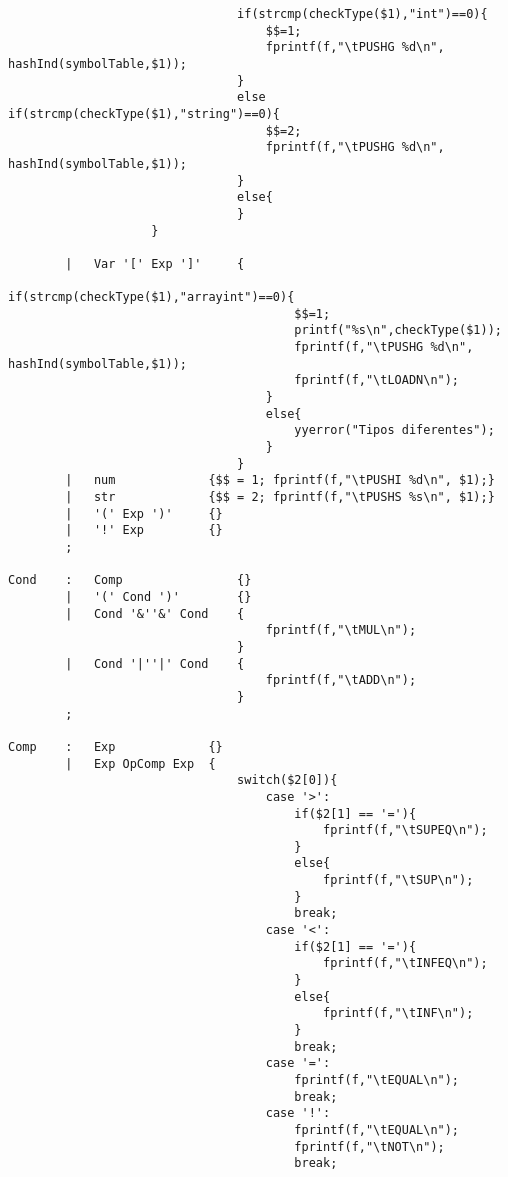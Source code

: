 \documentclass{report}
\begin{document}
\begin{verbatim}
                                if(strcmp(checkType($1),"int")==0){
                                    $$=1;
                                    fprintf(f,"\tPUSHG %d\n", hashInd(symbolTable,$1));
                                }
                                else if(strcmp(checkType($1),"string")==0){
                                    $$=2;
                                    fprintf(f,"\tPUSHG %d\n", hashInd(symbolTable,$1));
                                }
                                else{
                                }
                    }

        |   Var '[' Exp ']'     {
                                    if(strcmp(checkType($1),"arrayint")==0){
                                        $$=1;
                                        printf("%s\n",checkType($1));
                                        fprintf(f,"\tPUSHG %d\n", hashInd(symbolTable,$1));
                                        fprintf(f,"\tLOADN\n");
                                    }
                                    else{
                                        yyerror("Tipos diferentes");
                                    }
                                }
        |   num             {$$ = 1; fprintf(f,"\tPUSHI %d\n", $1);}
        |   str             {$$ = 2; fprintf(f,"\tPUSHS %s\n", $1);}
        |   '(' Exp ')'     {}
        |   '!' Exp         {}
        ;

Cond    :   Comp                {}
        |   '(' Cond ')'        {}
        |   Cond '&''&' Cond    {
                                    fprintf(f,"\tMUL\n");
                                }
        |   Cond '|''|' Cond    {
                                    fprintf(f,"\tADD\n");
                                }
        ;

Comp    :   Exp             {}
        |   Exp OpComp Exp  {
                                switch($2[0]){
                                    case '>':
                                        if($2[1] == '='){
                                            fprintf(f,"\tSUPEQ\n");
                                        }
                                        else{
                                            fprintf(f,"\tSUP\n");
                                        }
                                        break;
                                    case '<':
                                        if($2[1] == '='){
                                            fprintf(f,"\tINFEQ\n");
                                        }
                                        else{
                                            fprintf(f,"\tINF\n");
                                        }
                                        break;
                                    case '=':
                                        fprintf(f,"\tEQUAL\n");
                                        break;
                                    case '!':
                                        fprintf(f,"\tEQUAL\n");
                                        fprintf(f,"\tNOT\n");
                                        break;


\end{verbatim}
\end{document}
